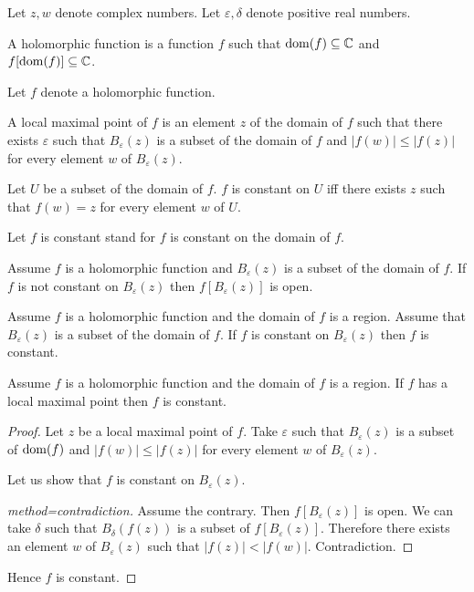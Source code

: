 \documentclass[english]{article}
\newcommand{\Ball}[2]{B_{#1}(#2)}
\begin{document}
\begin{forthel}
Let $z, w$ denote complex numbers.
Let $\varepsilon, \delta$ denote positive real numbers.

\begin{signature}
  A holomorphic function is a function $f$ such that $\operatorname{dom}(f) \subseteq \mathbb{C}$
  and $f[\operatorname{dom}(f)] \subseteq \mathbb{C}$.
\end{signature}

Let $f$ denote a holomorphic function.

\begin{definition}
  A local maximal point of $f$ is an element $z$ of the domain of $f$ such that there exists
  $\varepsilon$ such that $\Ball{\varepsilon}{z}$ is a subset of the domain of $f$ and
  $|f(w)| \leq |f(z)|$ for every element $w$ of $\Ball{\varepsilon}{z}$.
\end{definition}

\begin{definition}
  Let $U$ be a subset of the domain of $f$. $f$ is constant on $U$ iff there exists
  $z$ such that $f(w) = z$ for every element $w$ of $U$.
\end{definition}

Let $f$ is constant stand for $f$ is constant on the domain of $f$.

\begin{axiom}[title=Open Mapping Theorem]
  Assume $f$ is a holomorphic function and $\Ball{\varepsilon}{z}$ is a subset of the domain of $f$.
  If $f$ is not constant on $\Ball{\varepsilon}{z}$
  then $f[\Ball{\varepsilon}{z}]$ is open.
\end{axiom}

\begin{axiom}[title=Identity theorem]
  Assume $f$ is a holomorphic function and the domain of $f$ is a region.
  Assume that $\Ball{\varepsilon}{z}$ is a subset of the domain of $f$.
  If $f$ is constant on $\Ball{\varepsilon}{z}$ then $f$ is constant.
\end{axiom}

\begin{proposition}[title=Maximum modulus principle]
  Assume $f$ is a holomorphic function and the domain of $f$ is a region.
  If $f$ has a local maximal point then $f$ is constant.
\end{proposition}
\begin{proof}
  Let $z$ be a local maximal point of $f$.
  Take $\varepsilon$ such that
  $\Ball{\varepsilon}{z}$ is a subset of $\operatorname{dom}(f)$
  and $|f(w)| \leq |f(z)|$ for every element $w$ of $\Ball{\varepsilon}{z}$.

  Let us show that $f$ is constant on $\Ball{\varepsilon}{z}$.
  \begin{proof}[method=contradiction]
    Assume the contrary.
    Then $f[\Ball{\varepsilon}{z}]$ is open.
    We can take $\delta$ such that
    $\Ball{\delta}{f(z)}$ is a subset of $f[\Ball{\varepsilon}{z}]$.
    Therefore there exists an element $w$ of $\Ball{\varepsilon}{z}$ such that
    $|f(z)| < |f(w)|$.
    Contradiction.
  \end{proof}

  Hence $f$ is constant.
\end{proof}
\end{forthel}
\end{document}
